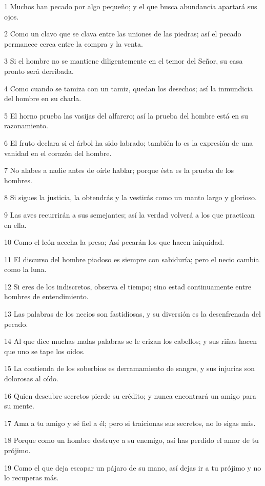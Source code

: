 \par 1 Muchos han pecado por algo pequeño; y el que busca abundancia apartará sus ojos.
\par 2 Como un clavo que se clava entre las uniones de las piedras; así el pecado permanece cerca entre la compra y la venta.
\par 3 Si el hombre no se mantiene diligentemente en el temor del Señor, su casa pronto será derribada.
\par 4 Como cuando se tamiza con un tamiz, quedan los desechos; así la inmundicia del hombre en su charla.
\par 5 El horno prueba las vasijas del alfarero; así la prueba del hombre está en su razonamiento.
\par 6 El fruto declara si el árbol ha sido labrado; también lo es la expresión de una vanidad en el corazón del hombre.
\par 7 No alabes a nadie antes de oírle hablar; porque ésta es la prueba de los hombres.
\par 8 Si sigues la justicia, la obtendrás y la vestirás como un manto largo y glorioso.
\par 9 Las aves recurrirán a sus semejantes; así la verdad volverá a los que practican en ella.
\par 10 Como el león acecha la presa; Así pecarán los que hacen iniquidad.
\par 11 El discurso del hombre piadoso es siempre con sabiduría; pero el necio cambia como la luna.
\par 12 Si eres de los indiscretos, observa el tiempo; sino estad continuamente entre hombres de entendimiento.
\par 13 Las palabras de los necios son fastidiosas, y su diversión es la desenfrenada del pecado.
\par 14 Al que dice muchas malas palabras se le erizan los cabellos; y sus riñas hacen que uno se tape los oídos.
\par 15 La contienda de los soberbios es derramamiento de sangre, y sus injurias son dolorosas al oído.
\par 16 Quien descubre secretos pierde su crédito; y nunca encontrará un amigo para su mente.
\par 17 Ama a tu amigo y sé fiel a él; pero si traicionas sus secretos, no lo sigas más.
\par 18 Porque como un hombre destruye a su enemigo, así has ​​perdido el amor de tu prójimo.
\par 19 Como el que deja escapar un pájaro de su mano, así dejas ir a tu prójimo y no lo recuperas más.
